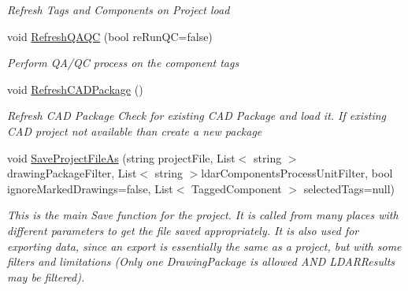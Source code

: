 \begin{DoxyCompactItemize}
\begin{DoxyCompactList}\small\item\em Refresh Tags and Components on Project load \end{DoxyCompactList}\item 
void \hyperlink{class_env_int_1_1_win32_1_1_field_tech_1_1_manager_1_1_main_form_a9ff21d5993b3edaf7160601db485f56c}{Refresh\+Q\+A\+Q\+C} (bool re\+Run\+Q\+C=false)
\begin{DoxyCompactList}\small\item\em Perform Q\+A/\+Q\+C process on the component tags \end{DoxyCompactList}\item 
void \hyperlink{class_env_int_1_1_win32_1_1_field_tech_1_1_manager_1_1_main_form_a71986f082bdc274afd230740a2e3f7c7}{Refresh\+C\+A\+D\+Package} ()
\begin{DoxyCompactList}\small\item\em Refresh C\+A\+D Package Check for existing C\+A\+D Package and load it. If existing C\+A\+D project not available than create a new package \end{DoxyCompactList}\item 
void \hyperlink{class_env_int_1_1_win32_1_1_field_tech_1_1_manager_1_1_main_form_aad8315e74f9fca1f0b126af137647e81}{Save\+Project\+File\+As} (string project\+File, List$<$ string $>$ drawing\+Package\+Filter, List$<$ string $>$ldar\+Components\+Process\+Unit\+Filter, bool ignore\+Marked\+Drawings=false, List$<$ Tagged\+Component $>$ selected\+Tags=null)
\begin{DoxyCompactList}\small\item\em This is the main Save function for the project. It is called from many places with different parameters to get the file saved appropriately. It is also used for exporting data, since an export is essentially the same as a project, but with some filters and limitations (Only one Drawing\+Package is allowed A\+N\+D L\+D\+A\+R\+Results may be filtered). \end{DoxyCompactList}\end{DoxyCompactItemize}
